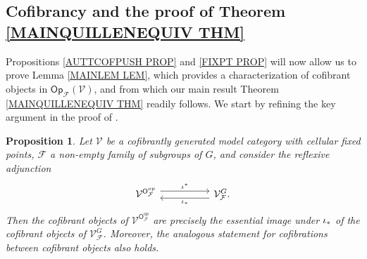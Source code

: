 \documentclass[a4paper,10pt
,draft
]{article}%
\numberwithin{equation}{section}
\numberwithin{figure}{section}
\newtheorem{proposition}[equation]{Proposition}%
\theoremstyle{definition} %
\newcommand{\1}{\ensuremath{\mathbbm 1}}%
\begin{document}
\subsection{Cofibrancy and the proof of Theorem \ref{MAINQUILLENEQUIV THM}}
\label{MAINTHM_PROOF_SECTION}


Propositions \ref{AUTTCOFPUSH PROP} and \ref{FIXPT PROP} will now allow us to prove Lemma \ref{MAINLEM LEM}, which provides a characterization of cofibrant objects in 
$\mathsf{Op}_{\mathcal{F}}(\mathcal{V})$,
and from which our main 
result Theorem \ref{MAINQUILLENEQUIV THM}
readily follows.
We start by refining the key argument in the proof of
\cite[Thm. 2.10]{Ste16}.


\begin{proposition}\label{COFESSIM PROP}
	Let $\mathcal{V}$ be a cofibrantly generated model category with cellular fixed points, $\mathcal{F}$ a non-empty family of subgroups of $G$,
	and consider the reflexive adjunction
\[
\begin{tikzcd}[column sep =5em]
	\mathcal{V}^{\mathsf{O}_{\mathcal{F}}^{op}}
	\ar[shift left=1.5]{r}{\iota^{\**}} 
&
	\mathcal{V}^G_{\mathcal{F}}
	\ar[shift left=1.5]{l}{\iota_{\**}}.
\end{tikzcd}
\]
Then the cofibrant objects of 
$\mathcal{V}^{\mathsf{O}_{\mathcal{F}}^{op}}$
are precisely the essential image under $\iota_{\**}$
of the cofibrant objects of
$\mathcal{V}^G_{\mathcal{F}}$.
Moreover, the analogous statement for cofibrations between cofibrant objects also holds.
\end{proposition}
\end{document}
